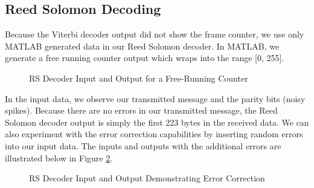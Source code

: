 \documentclass[conference,onecolumn]{IEEEtran}
\begin{document}
\subsection{Reed Solomon Decoding}

Because the Viterbi decoder output did not show the frame counter, we use only MATLAB generated data in our Reed Solomon decoder. In MATLAB, we generate a free running counter output which wraps into the range [0, 255].

\begin{figure}[H]
	\centerline{}
	\caption{RS Decoder Input and Output for a Free-Running Counter}
	\label{fig::RS_decoder_output}
\end{figure}

In the input data, we observe our transmitted message and the parity bits (noisy spikes). Because there are no errors in our transmitted message, the Reed Solomon decoder output is simply the first 223 bytes in the received data. We can also experiment with the error correction capabilities by inserting random errors into our input data. The inputs and outputs with the additional errors are illustrated below in Figure \ref{fig::RS_decoder_output_errors}.

\begin{figure}[H]
	\centerline{}
	\caption{RS Decoder Input and Output Demonstrating Error Correction}
	\label{fig::RS_decoder_output_errors}
\end{figure}
\end{document}

